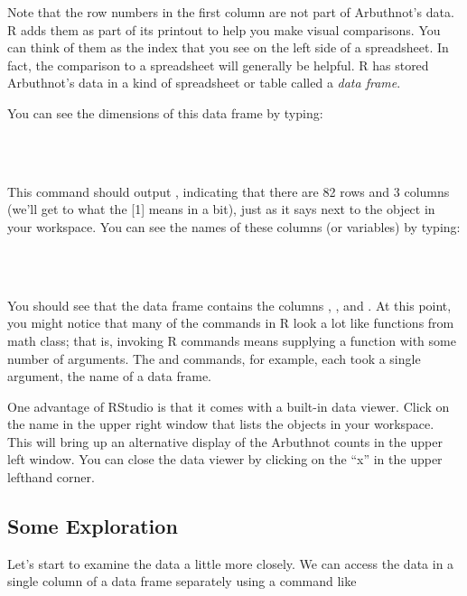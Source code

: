 \documentclass[11pt]{article}
\begin{document}
Note that the row numbers in the first column are not part of Arbuthnot's data. R adds them as part of its printout to help you make visual comparisons. You can think of them as the index that you see on the left side of a spreadsheet. In fact, the comparison to a spreadsheet will generally be helpful. R has stored Arbuthnot's data in a kind of spreadsheet or table called a \emph{data frame}.

You can see the dimensions of this data frame by typing:

\ttfamily
\hlstd{}\hspace*{\fill}\\
\hlstd{}\hlkeyword{(}\hlkeyword{)}\hspace*{\fill}\\
\normalfont

This command should output \texttt{}, indicating that there are 82 rows and 3 columns (we'll get to what the [1] means in a bit), just as it says next to the object in your workspace. You can see the names of these columns (or variables) by typing:

\ttfamily
\hlstd{}\hspace*{\fill}\\
\hlstd{}\hlkeyword{(}\hlkeyword{)}\hspace*{\fill}\\
\normalfont

You should see that the data frame contains the columns \texttt{},  \texttt{}, and  \texttt{}. At this point, you might notice that many of the commands in R look a lot like functions from math class; that is, invoking R commands means supplying a function with some number of arguments. The \texttt{} and \texttt{} commands, for example, each took a single argument, the name of a data frame. 

One advantage of RStudio is that it comes with a built-in data viewer. Click on the name \texttt{} in the upper right window that lists the objects in your workspace. This will bring up an alternative display of the Arbuthnot counts in the upper left window. You can close the data viewer by clicking on the ``x'' in the upper lefthand corner. 


\subsection*{Some Exploration}
Let's start to examine the data a little more closely. We can access the data in a single column of a data frame separately using a command like
\end{document}
